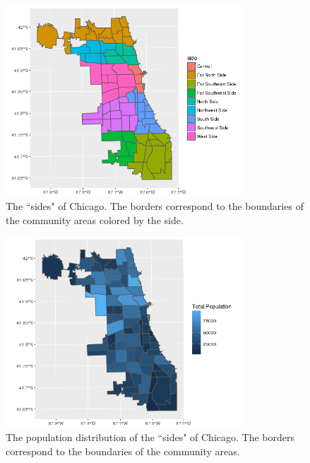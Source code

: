 \documentclass{article} %
\begin{document}
\begin{figure}[h]
\begin{center}

\includegraphics[width=0.8\textwidth,keepaspectratio]{CopyOfside.png}
\caption{The ``sides" of Chicago.  The borders correspond to  the boundaries of the community areas colored by the side.}
\label{sides}
\end{center}
\end{figure}


\begin{figure}[h]
\begin{center}

\includegraphics[width=0.8\textwidth,keepaspectratio]{Plots/population.png}
\caption{The population distribution of the  ``sides" of Chicago.  The borders correspond to  the boundaries of the community areas.}
\label{population}
\end{center}
\end{figure}
\end{document}
